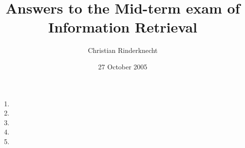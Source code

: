 \documentclass[11pt]{article}
\title{Answers to the Mid-term exam of Information Retrieval}
\author{Christian Rinderknecht}
\date{27 October 2005}
\begin{document}
\maketitle

\begin{enumerate}

  \item
    
    

  \item
    
    

  \item
    
    

  \item
    
    

  \item
    
    

\end{enumerate}
\end{document}

